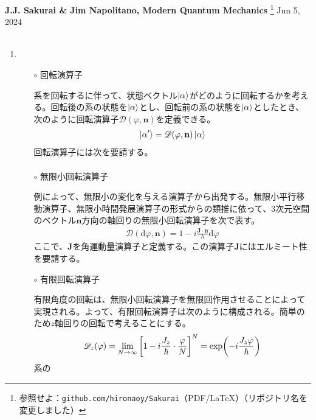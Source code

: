 \documentclass{jarticle}
\begin{document}
\noindent
\textbf{J.J. Sakurai \& Jim Napolitano, Modern Quantum Mechanics}
\footnote{
参照せよ：\texttt{github.com/hironaoy/Sakurai}（PDF/\LaTeX）（リポジトリ名を変更しました）
}
\hfill Jun 5, 2024\vspace{-2mm} \\
\hrulefill \\

\noindent
\begin{enumerate}
\item {}

  \begin{itemize}
  \item [$\circ$] 回転演算子

    系を回転するに伴って、状態ベクトル$\ket{\alpha}$がどのように回転するかを考える。回転後の系の状態を$\ket{\alpha}$とし、回転前の系の状態を$\ket{\alpha}$としたとき、次のように回転演算子$\mathscr{D}(\varphi, \mathbf{n})$を定義できる。
    \begin{align}
      \ket{\alpha'} = \mathscr{D}(\varphi, \mathbf{n}) \ket{\alpha}
    \end{align}
    回転演算子には次を要請する。
    \begin{align}
      
    \end{align}

  \item [$\circ$] 無限小回転演算子
    
    例によって、無限小の変化を与える演算子から出発する。無限小平行移動演算子、無限小時間発展演算子の形式からの類推に依って、3次元空間のベクトル$\mathbf{n}$方向の軸回りの無限小回転演算子を次で表す。
    \begin{align}
      \mathscr{D}(\mathrm{d}\varphi, \mathbf{n}) = 1 - i\frac{\mathbf{J}\cdot\mathbf{n}}{\hbar}\mathrm{d}\varphi
    \end{align}
    ここで、$\mathbf{J}$を角運動量演算子と定義する。この演算子$\mathbf{J}$にはエルミート性を要請する。

  \item [$\circ$] 有限回転演算子

    有限角度の回転は、無限小回転演算子を無限回作用させることによって実現される。よって、有限回転演算子は次のように構成される。簡単のため$z$軸回りの回転で考えることにする。
    \begin{align}
      \mathscr{D}_z(\varphi) = \lim_{N \rightarrow \infty} \qty[1 - i\frac{J_z}{\hbar} \cdot \frac{\varphi}{N}]^N = \exp(-i\frac{J_z\varphi}{\hbar})
    \end{align}
    系の
  \end{itemize}
\end{enumerate}
\end{document}
